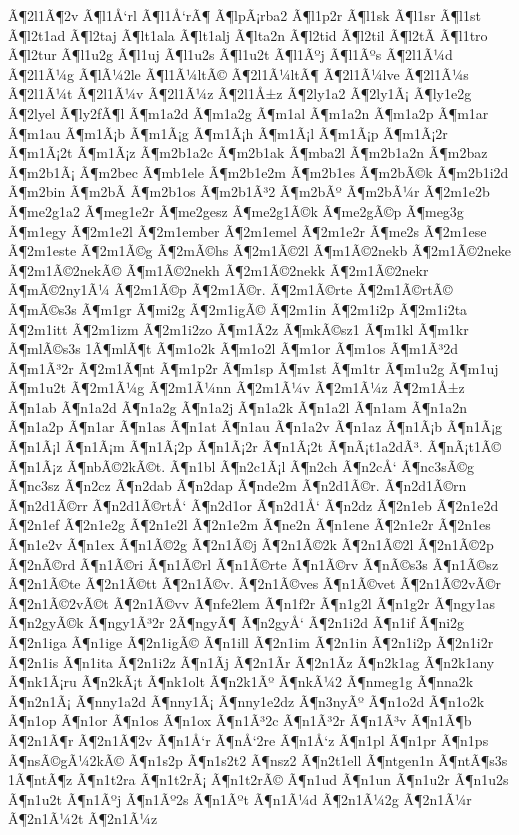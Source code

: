 {Ã¶2l1Ã¶2v
Ã¶l1Å‘rl
Ã¶l1Å‘rÃ¶
Ã¶lpÃ¡rba2
Ã¶l1p2r
Ã¶l1sk
Ã¶l1sr
Ã¶l1st
Ã¶l2t1ad
Ã¶l2taj
Ã¶lt1ala
Ã¶lt1alj
Ã¶lta2n
Ã¶l2tid
Ã¶l2til
Ã¶l2tÃ­
Ã¶l1tro
Ã¶l2tur
Ã¶l1u2g
Ã¶l1uj
Ã¶l1u2s
Ã¶l1u2t
Ã¶l1Ãºj
Ã¶l1Ãºs
Ã¶2l1Ã¼d
Ã¶2l1Ã¼g
Ã¶lÃ¼2le
Ã¶l1Ã¼ltÃ©
Ã¶2l1Ã¼ltÃ¶
Ã¶2l1Ã¼lve
Ã¶2l1Ã¼s
Ã¶2l1Ã¼t
Ã¶2l1Ã¼v
Ã¶2l1Ã¼z
Ã¶2l1Å±z
Ã¶2ly1a2
Ã¶2ly1Ã¡
Ã¶ly1e2g
Ã¶2lyel
Ã¶ly2fÃ¶l
Ã¶m1a2d
Ã¶m1a2g
Ã¶m1al
Ã¶m1a2n
Ã¶m1a2p
Ã¶m1ar
Ã¶m1au
Ã¶m1Ã¡b
Ã¶m1Ã¡g
Ã¶m1Ã¡h
Ã¶m1Ã¡l
Ã¶m1Ã¡p
Ã¶m1Ã¡2r
Ã¶m1Ã¡2t
Ã¶m1Ã¡z
Ã¶m2b1a2c
Ã¶m2b1ak
Ã¶mba2l
Ã¶m2b1a2n
Ã¶m2baz
Ã¶m2b1Ã¡
Ã¶m2bec
Ã¶mb1ele
Ã¶m2b1e2m
Ã¶m2b1es
Ã¶m2bÃ©k
Ã¶m2b1i2d
Ã¶m2bin
Ã¶m2bÃ­
Ã¶m2b1os
Ã¶m2b1Ã³2
Ã¶m2bÃº
Ã¶m2bÃ¼r
Ã¶2m1e2b
Ã¶me2g1a2
Ã¶meg1e2r
Ã¶me2gesz
Ã¶me2g1Ã©k
Ã¶me2gÃ©p
Ã¶meg3g
Ã¶m1egy
Ã¶2m1e2l
Ã¶2m1ember
Ã¶2m1emel
Ã¶2m1e2r
Ã¶me2s
Ã¶2m1ese
Ã¶2m1este
Ã¶2m1Ã©g
Ã¶2mÃ©hs
Ã¶2m1Ã©2l
Ã¶m1Ã©2nekb
Ã¶2m1Ã©2neke
Ã¶2m1Ã©2nekÃ©
Ã¶m1Ã©2nekh
Ã¶2m1Ã©2nekk
Ã¶2m1Ã©2nekr
Ã¶mÃ©2ny1Ã¼
Ã¶2m1Ã©p
Ã¶2m1Ã©r.
Ã¶2m1Ã©rte
Ã¶2m1Ã©rtÃ©
Ã¶mÃ©s3s
Ã¶m1gr
Ã¶mi2g
Ã¶2m1igÃ©
Ã¶2m1in
Ã¶2m1i2p
Ã¶2m1i2ta
Ã¶2m1itt
Ã¶2m1izm
Ã¶2m1i2zo
Ã¶m1Ã­2z
Ã¶mkÃ©sz1
Ã¶m1kl
Ã¶m1kr
Ã¶mlÃ©s3s
1Ã¶mlÃ¶t
Ã¶m1o2k
Ã¶m1o2l
Ã¶m1or
Ã¶m1os
Ã¶m1Ã³2d
Ã¶m1Ã³2r
Ã¶2m1Ã¶nt
Ã¶m1p2r
Ã¶m1sp
Ã¶m1st
Ã¶m1tr
Ã¶m1u2g
Ã¶m1uj
Ã¶m1u2t
Ã¶2m1Ã¼g
Ã¶2m1Ã¼nn
Ã¶2m1Ã¼v
Ã¶2m1Ã¼z
Ã¶2m1Å±z
Ã¶n1ab
Ã¶n1a2d
Ã¶n1a2g
Ã¶n1a2j
Ã¶n1a2k
Ã¶n1a2l
Ã¶n1am
Ã¶n1a2n
Ã¶n1a2p
Ã¶n1ar
Ã¶n1as
Ã¶n1at
Ã¶n1au
Ã¶n1a2v
Ã¶n1az
Ã¶n1Ã¡b
Ã¶n1Ã¡g
Ã¶n1Ã¡l
Ã¶n1Ã¡m
Ã¶n1Ã¡2p
Ã¶n1Ã¡2r
Ã¶n1Ã¡2t
Ã¶nÃ¡t1a2dÃ³.
Ã¶nÃ¡t1Ã©
Ã¶n1Ã¡z
Ã¶nbÃ©2kÃ©t.
Ã¶n1bl
Ã¶n2c1Ã¡l
Ã¶n2ch
Ã¶n2cÅ‘
Ã¶nc3sÃ©g
Ã¶nc3sz
Ã¶n2cz
Ã¶n2dab
Ã¶n2dap
Ã¶nde2m
Ã¶n2d1Ã©r.
Ã¶n2d1Ã©rn
Ã¶n2d1Ã©rr
Ã¶n2d1Ã©rtÅ‘
Ã¶n2d1or
Ã¶n2d1Å‘
Ã¶n2dz
Ã¶2n1eb
Ã¶2n1e2d
Ã¶2n1ef
Ã¶2n1e2g
Ã¶2n1e2l
Ã¶2n1e2m
Ã¶ne2n
Ã¶n1ene
Ã¶2n1e2r
Ã¶2n1es
Ã¶n1e2v
Ã¶n1ex
Ã¶n1Ã©2g
Ã¶2n1Ã©j
Ã¶2n1Ã©2k
Ã¶2n1Ã©2l
Ã¶2n1Ã©2p
Ã¶2nÃ©rd
Ã¶n1Ã©ri
Ã¶n1Ã©rl
Ã¶n1Ã©rte
Ã¶n1Ã©rv
Ã¶nÃ©s3s
Ã¶n1Ã©sz
Ã¶2n1Ã©te
Ã¶2n1Ã©tt
Ã¶2n1Ã©v.
Ã¶2n1Ã©ves
Ã¶n1Ã©vet
Ã¶2n1Ã©2vÃ©r
Ã¶2n1Ã©2vÃ©t
Ã¶2n1Ã©vv
Ã¶nfe2lem
Ã¶n1f2r
Ã¶n1g2l
Ã¶n1g2r
Ã¶ngy1as
Ã¶n2gyÃ©k
Ã¶ngy1Ã³2r
2Ã¶ngyÃ¶
Ã¶n2gyÅ‘
Ã¶2n1i2d
Ã¶n1if
Ã¶ni2g
Ã¶2n1iga
Ã¶n1ige
Ã¶2n1igÃ©
Ã¶n1ill
Ã¶2n1im
Ã¶2n1in
Ã¶2n1i2p
Ã¶2n1i2r
Ã¶2n1is
Ã¶n1ita
Ã¶2n1i2z
Ã¶n1Ã­j
Ã¶2n1Ã­r
Ã¶2n1Ã­z
Ã¶n2k1ag
Ã¶n2k1any
Ã¶nk1Ã¡ru
Ã¶n2kÃ¡t
Ã¶nk1olt
Ã¶n2k1Ãº
Ã¶nkÃ¼2
Ã¶nmeg1g
Ã¶nna2k
Ã¶n2n1Ã¡
Ã¶nny1a2d
Ã¶nny1Ã¡
Ã¶nny1e2dz
Ã¶n3nyÃº
Ã¶n1o2d
Ã¶n1o2k
Ã¶n1op
Ã¶n1or
Ã¶n1os
Ã¶n1ox
Ã¶n1Ã³2c
Ã¶n1Ã³2r
Ã¶n1Ã³v
Ã¶n1Ã¶b
Ã¶2n1Ã¶r
Ã¶2n1Ã¶2v
Ã¶n1Å‘r
Ã¶nÅ‘2re
Ã¶n1Å‘z
Ã¶n1pl
Ã¶n1pr
Ã¶n1ps
Ã¶nsÃ©gÃ¼2kÃ©
Ã¶n1s2p
Ã¶n1s2t2
Ã¶nsz2
Ã¶n2t1ell
Ã¶ntgen1n
Ã¶ntÃ¶s3s
1Ã¶ntÃ¶z
Ã¶n1t2ra
Ã¶n1t2rÃ¡
Ã¶n1t2rÃ©
Ã¶n1ud
Ã¶n1un
Ã¶n1u2r
Ã¶n1u2s
Ã¶n1u2t
Ã¶n1Ãºj
Ã¶n1Ãº2s
Ã¶n1Ãºt
Ã¶n1Ã¼d
Ã¶2n1Ã¼2g
Ã¶2n1Ã¼r
Ã¶2n1Ã¼2t
Ã¶2n1Ã¼z
}
